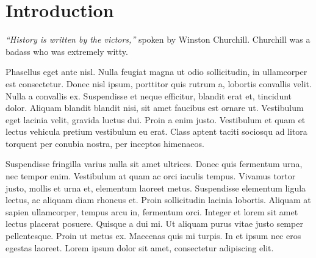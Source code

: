 \section{Introduction}

\textit{``History is written by the victors,''} spoken by Winston Churchill.  Churchill was a badass who was extremely witty.

Phasellus eget ante nisl. Nulla feugiat magna ut odio sollicitudin, in ullamcorper est consectetur. Donec nisl ipsum, porttitor quis rutrum a, lobortis convallis velit. Nulla a convallis ex. Suspendisse et neque efficitur, blandit erat et, tincidunt dolor. Aliquam blandit blandit nisi, sit amet faucibus est ornare ut. Vestibulum eget lacinia velit, gravida luctus dui. Proin a enim justo. Vestibulum et quam et lectus vehicula pretium vestibulum eu erat. Class aptent taciti sociosqu ad litora torquent per conubia nostra, per inceptos himenaeos.

Suspendisse fringilla varius nulla sit amet ultrices. Donec quis fermentum urna, nec tempor enim. Vestibulum at quam ac orci iaculis tempus. Vivamus tortor justo, mollis et urna et, elementum laoreet metus. Suspendisse elementum ligula lectus, ac aliquam diam rhoncus et. Proin sollicitudin lacinia lobortis. Aliquam at sapien ullamcorper, tempus arcu in, fermentum orci. Integer et lorem sit amet lectus placerat posuere. Quisque a dui mi. Ut aliquam purus vitae justo semper pellentesque. Proin ut metus ex. Maecenas quis mi turpis. In et ipsum nec eros egestas laoreet. Lorem ipsum dolor sit amet, consectetur adipiscing elit.
